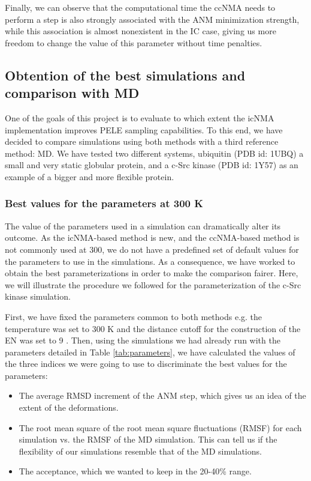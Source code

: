 Finally, we can observe that the computational time the ccNMA needs to perform a step is also strongly associated with the ANM minimization strength, while this association is almost nonexistent in the IC case, giving us more freedom to change the value of this parameter without time penalties.  

\subsection{Obtention of the best simulations and comparison with MD}
One of the goals of this project is to evaluate to which extent the icNMA implementation improves PELE sampling capabilities. To this end, we have decided to compare simulations using both methods with a third reference method: MD. We have tested two different systems, ubiquitin (PDB id: 1UBQ) a small and very static globular protein,  and a c-Src kinase (PDB id: 1Y57) as an example of a bigger and more flexible protein.

\subsubsection{Best values for the parameters at 300 K} 
The value of the parameters used in a simulation can dramatically alter its outcome. As the icNMA-based method is new, and the ccNMA-based method is not  commonly used at 300, we do not have a predefined set of default values for the parameters to use in the simulations. As a consequence, we have worked to obtain the best parameterizations in order to make the comparison fairer. Here, we will illustrate the procedure we followed for the parameterization of the c-Src kinase simulation.
 
First, we have fixed the parameters common to both methods e.g. the temperature was set to 300 K and the distance cutoff for the construction of the EN was set to 9 \angstrom. Then, using the simulations we had already run with the parameters detailed in Table \ref{tab:parameters}, we have calculated the values of the three indices we were going to use to discriminate the best values for the parameters: 

\begin{itemize}
\item The average RMSD increment of the ANM step, which gives us an idea of the extent of the deformations.
\item The root mean square of the root mean square fluctuations (RMSF) for each simulation vs. the RMSF of the MD simulation. This can tell us if the flexibility of our simulations resemble that of the MD simulations.
\item The acceptance, which we wanted to keep in the 20-40\% range.  
\end{itemize}

